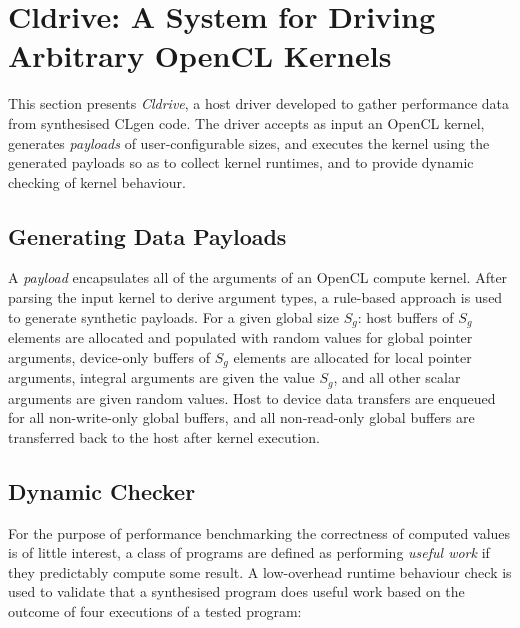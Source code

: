 \section{Cldrive: A System for Driving Arbitrary OpenCL Kernels}
\label{sec:cldrive}

This section presents \emph{Cldrive}, a host driver developed to gather performance data from synthesised CLgen code. The driver accepts as input an OpenCL kernel, generates \emph{payloads} of user-configurable sizes, and executes the kernel using the generated payloads so as to collect kernel runtimes, and to provide dynamic checking of kernel behaviour.

\subsection{Generating Data Payloads}

A \emph{payload} encapsulates all of the arguments of an OpenCL compute kernel. After parsing the input kernel to derive argument types, a rule-based approach is used to generate synthetic payloads. For a given global size $S_g$: host buffers of $S_g$ elements are allocated and populated with random values for global pointer arguments, device-only buffers of $S_g$ elements are allocated for local pointer arguments, integral arguments are given the value $S_g$, and all other scalar arguments are given random values. Host to device data transfers are enqueued for all non-write-only global buffers, and all non-read-only global buffers are transferred back to the host after kernel execution.

\subsection{Dynamic Checker}

For the purpose of performance benchmarking the correctness of computed values is of little interest, a class of programs are defined as performing \emph{useful work} if they predictably compute some result. A low-overhead runtime behaviour check is used to validate that a synthesised program does useful work based on the outcome of four executions of a tested program:

